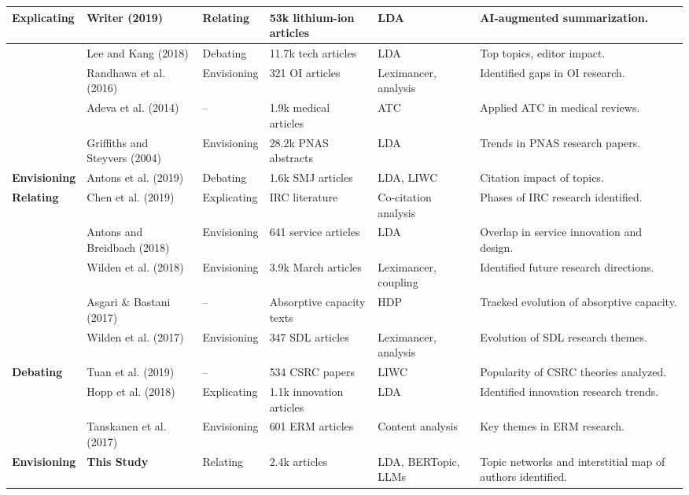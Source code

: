 \documentclass[12pt]{article}
\begin{document}
\begin{table}
\begin{longtable}{|p{3cm}|p{3cm}|p{3cm}|p{3cm}|p{3cm}|p{4cm}|}
\textbf{Explicating} & Writer (2019) & Relating & 53k lithium-ion articles & LDA & AI-augmented summarization. \\ \hline
 & Lee and Kang (2018) & Debating & 11.7k tech articles & LDA & Top topics, editor impact. \\ \hline
 & Randhawa et al. (2016) & Envisioning & 321 OI articles & Leximancer, analysis & Identified gaps in OI research. \\ \hline
 & Adeva et al. (2014) & -- & 1.9k medical articles & ATC & Applied ATC in medical reviews. \\ \hline
 & Griffiths and Steyvers (2004) & Envisioning & 28.2k PNAS abstracts & LDA & Trends in PNAS research papers. \\ \hline
\textbf{Envisioning} & Antons et al. (2019) & Debating & 1.6k SMJ articles & LDA, LIWC & Citation impact of topics. \\ \hline
\textbf{Relating} & Chen et al. (2019) & Explicating & IRC literature & Co-citation analysis & Phases of IRC research identified. \\ \hline
 & Antons and Breidbach (2018) & Envisioning & 641 service articles & LDA & Overlap in service innovation and design. \\ \hline
 & Wilden et al. (2018) & Envisioning & 3.9k March articles & Leximancer, coupling & Identified future research directions. \\ \hline
 & Asgari \& Bastani (2017) & -- & Absorptive capacity texts & HDP & Tracked evolution of absorptive capacity. \\ \hline
 & Wilden et al. (2017) & Envisioning & 347 SDL articles & Leximancer, analysis & Evolution of SDL research themes. \\ \hline
\textbf{Debating} & Tuan et al. (2019) & -- & 534 CSRC papers & LIWC & Popularity of CSRC theories analyzed. \\ \hline
 & Hopp et al. (2018) & Explicating & 1.1k innovation articles & LDA & Identified innovation research trends. \\ \hline
 & Tanskanen et al. (2017) & Envisioning & 601 ERM articles & Content analysis & Key themes in ERM research. \\ \hline
\textbf{Envisioning} & \textbf{This Study} & Relating & 2.4k articles & LDA, BERTopic, LLMs & Topic networks and interstitial map of authors identified. \\ \hline

\end{longtable}
\end{table}
\end{document}
